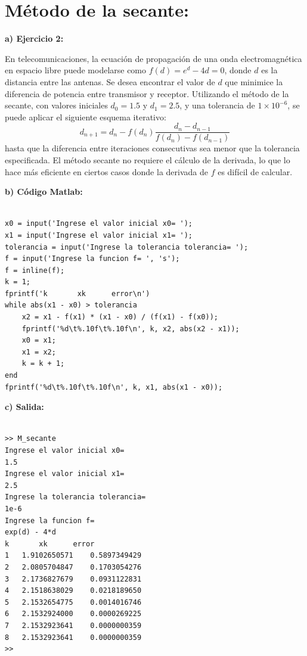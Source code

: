 \documentclass[12pt,a4paper,twoside]{article}  %
\begin{document}
\section{Método de la secante: }

\textbf{a) Ejercicio 2: }

En telecomunicaciones, la ecuación de propagación de una onda electromagnética en espacio libre puede modelarse como \( f(d) = e^d - 4d = 0 \), donde \( d \) es la distancia entre las antenas. Se desea encontrar el valor de \( d \) que minimice la diferencia de potencia entre transmisor y receptor. Utilizando el método de la secante, con valores iniciales \( d_0 = 1.5 \) y \( d_1 = 2.5 \), y una tolerancia de \( 1 \times 10^{-6} \), se puede aplicar el siguiente esquema iterativo:
\[
d_{n+1} = d_n - f(d_n) \frac{d_n - d_{n-1}}{f(d_n) - f(d_{n-1})}
\]
hasta que la diferencia entre iteraciones consecutivas sea menor que la tolerancia especificada. El método secante no requiere el cálculo de la derivada, lo que lo hace más eficiente en ciertos casos donde la derivada de \( f \) es difícil de calcular.


\textbf{b) Código Matlab:}

\begin{lstlisting}

x0 = input('Ingrese el valor inicial x0= ');
x1 = input('Ingrese el valor inicial x1= ');
tolerancia = input('Ingrese la tolerancia tolerancia= ');
f = input('Ingrese la funcion f= ', 's');
f = inline(f);
k = 1;
fprintf('k       xk      error\n')
while abs(x1 - x0) > tolerancia
    x2 = x1 - f(x1) * (x1 - x0) / (f(x1) - f(x0));
    fprintf('%d\t%.10f\t%.10f\n', k, x2, abs(x2 - x1));
    x0 = x1;
    x1 = x2;
    k = k + 1;
end
fprintf('%d\t%.10f\t%.10f\n', k, x1, abs(x1 - x0));

\end{lstlisting}

\textbf{c) Salida:}

\begin{verbatim}

>> M_secante
Ingrese el valor inicial x0= 
1.5
Ingrese el valor inicial x1= 
2.5
Ingrese la tolerancia tolerancia= 
1e-6
Ingrese la funcion f= 
exp(d) - 4*d
k       xk      error
1	1.9102650571	0.5897349429
2	2.0805704847	0.1703054276
3	2.1736827679	0.0931122831
4	2.1518638029	0.0218189650
5	2.1532654775	0.0014016746
6	2.1532924000	0.0000269225
7	2.1532923641	0.0000000359
8	2.1532923641	0.0000000359
>> 

\end{verbatim}
\end{document}
